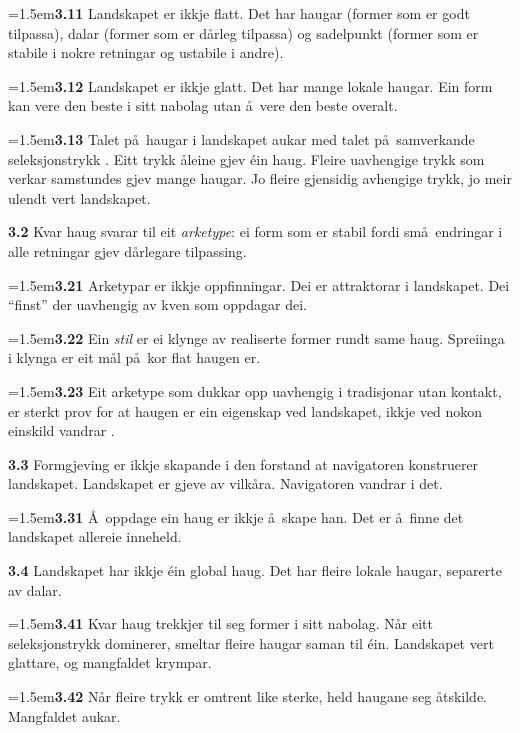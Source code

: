\documentclass[11pt, a4paper]{article}
\newcommand{\prop}[1]{\bigskip\noindent{\Large\textbf{#1}}\medskip\par}
\newcommand{\subprop}[1]{\medskip\noindent\textbf{#1}\quad}
\newcommand{\subsubprop}[1]{\smallskip\hangindent=1.5em\noindent\hspace{1.5em}\textbf{#1}\quad}
\begin{document}
\subsubprop{3.11} Landskapet er ikkje flatt. Det har haugar (former som er godt tilpassa), dalar (former som er d\aa rleg tilpassa) og sadelpunkt (former som er stabile i nokre retningar og ustabile i andre).

\subsubprop{3.12} Landskapet er ikkje glatt. Det har mange lokale haugar. Ein form kan vere den beste i sitt nabolag utan \aa\ vere den beste overalt.

\subsubprop{3.13} Talet p\aa\ haugar i landskapet aukar med talet p\aa\ samverkande seleksjonstrykk \citep[jf.\ NK-modellen i][]{kauffman1993}. Eitt trykk \aa leine gjev \'ein haug. Fleire uavhengige trykk som verkar samstundes gjev mange haugar. Jo fleire gjensidig avhengige trykk, jo meir ulendt vert landskapet.

\subprop{3.2} Kvar haug svarar til eit \textit{arketype}: ei form som er stabil fordi sm\aa\ endringar i alle retningar gjev d\aa rlegare tilpassing.

\subsubprop{3.21} Arketypar er ikkje oppfinningar. Dei er attraktorar i landskapet. Dei ``finst'' der uavhengig av kven som oppdagar dei.

\subsubprop{3.22} Ein \textit{stil} er ei klynge av realiserte former rundt same haug. Spreiinga i klynga er eit m\aa l p\aa\ kor flat haugen er.

\subsubprop{3.23} Eit arketype som dukkar opp uavhengig i tradisjonar utan kontakt, er sterkt prov for at haugen er ein eigenskap ved landskapet, ikkje ved nokon einskild vandrar \citep[jf.\ konvergent evolusjon i][]{conwaymorris2003}.

\subprop{3.3} Formgjeving er ikkje skapande i den forstand at navigatoren konstruerer landskapet. Landskapet er gjeve av vilk\aa ra. Navigatoren vandrar i det.

\subsubprop{3.31} \AA\ oppdage ein haug er ikkje \aa\ skape han. Det er \aa\ finne det landskapet allereie inneheld.

\subprop{3.4} Landskapet har ikkje \'ein global haug. Det har fleire lokale haugar, separerte av dalar.

\subsubprop{3.41} Kvar haug trekkjer til seg former i sitt nabolag. N\aa r eitt seleksjonstrykk dominerer, smeltar fleire haugar saman til \'ein. Landskapet vert glattare, og mangfaldet krympar.

\subsubprop{3.42} N\aa r fleire trykk er omtrent like sterke, held haugane seg \aa tskilde. Mangfaldet aukar.

\prop{4 Landskapet er i r\o rsle.}
\end{document}
